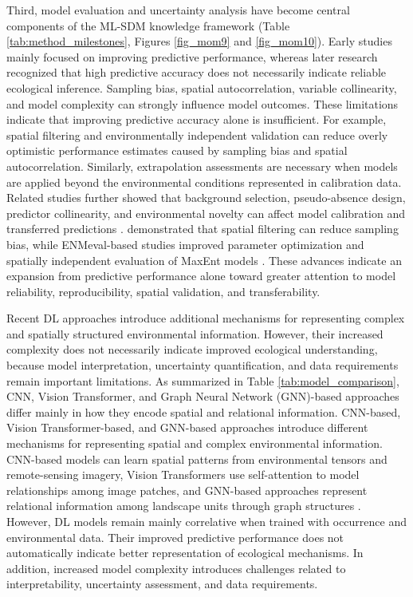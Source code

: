 \documentclass[authoryear,preprint,review,12pt]{elsarticle}
\begin{document}
Third, model evaluation and uncertainty analysis have become central components of the ML-SDM knowledge framework (Table \ref{tab:method_milestones}, Figures \ref{fig_mom9} and \ref{fig_mom10}). Early studies mainly focused on improving predictive performance, whereas later research recognized that high predictive accuracy does not necessarily indicate reliable ecological inference. Sampling bias, spatial autocorrelation, variable collinearity, and model complexity can strongly influence model outcomes. These limitations indicate that improving predictive accuracy alone is insufficient. For example, spatial filtering and environmentally independent validation can reduce overly optimistic performance estimates caused by sampling bias and spatial autocorrelation. Similarly, extrapolation assessments are necessary when models are applied beyond the environmental conditions represented in calibration data. Related studies further showed that background selection, pseudo-absence design, predictor collinearity, and environmental novelty can affect model calibration and transferred predictions \citep{phillips2009sample,barbet2012selecting,de2018evaluating,feng2019collinearity}. \cite{boria2014spatial} demonstrated that spatial filtering can reduce sampling bias, while ENMeval-based studies improved parameter optimization and spatially independent evaluation of MaxEnt models \citep{muscarella2014enm,kass2021enmeval}. These advances indicate an expansion from predictive performance alone toward greater attention to model reliability, reproducibility, spatial validation, and transferability.

Recent DL approaches introduce additional mechanisms for representing complex and spatially structured environmental information. However, their increased complexity does not necessarily indicate improved ecological understanding, because model interpretation, uncertainty quantification, and data requirements remain important limitations. As summarized in Table \ref{tab:model_comparison}, CNN, Vision Transformer, and Graph Neural Network (GNN)-based approaches differ mainly in how they encode spatial and relational information. CNN-based, Vision Transformer-based, and GNN-based approaches introduce different mechanisms for representing spatial and complex environmental information. CNN-based models can learn spatial patterns from environmental tensors and remote-sensing imagery, Vision Transformers use self-attention to model relationships among image patches, and GNN-based approaches represent relational information among landscape units through graph structures \citep{deneu2021convolutional,estopinan2022deep,hu2025introduction,wu2025gnn}. However, DL models remain mainly correlative when trained with occurrence and environmental data. Their improved predictive performance does not automatically indicate better representation of ecological mechanisms. In addition, increased model complexity introduces challenges related to interpretability, uncertainty assessment, and data requirements.
\end{document}
